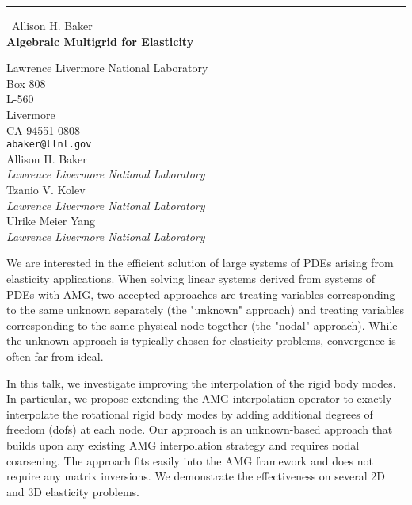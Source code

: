 \documentclass{report}
\begin{document}
\begin{center}
\rule{6in}{1pt} \
{\large Allison H. Baker \\
{\bf Algebraic Multigrid for Elasticity}}

Lawrence Livermore National Laboratory \\ Box 808 \\ L-560 \\ Livermore \\ CA 94551-0808
\\
{\tt abaker@llnl.gov}\\
Allison H. Baker\\
{\em Lawrence Livermore National Laboratory}\\
Tzanio V. Kolev\\
{\em Lawrence Livermore National Laboratory}\\
Ulrike Meier Yang \\
{\em Lawrence Livermore National Laboratory}\end{center}

We are interested in the efficient solution of large systems of PDEs
arising from elasticity applications. When solving linear systems
derived from systems of PDEs with AMG, two accepted approaches are
treating variables corresponding to the same unknown separately (the
"unknown" approach) and treating variables corresponding to the same
physical node together (the "nodal" approach). While the unknown
approach is typically chosen for elasticity problems, convergence is
often far from ideal.

In this talk, we investigate improving the interpolation of the rigid
body modes. In particular, we propose extending the AMG interpolation
operator to exactly interpolate the rotational rigid body modes by
adding additional degrees of freedom (dofs) at each node. Our approach
is an unknown-based approach that builds upon any existing AMG
interpolation strategy and requires nodal coarsening. The approach
fits easily into the AMG framework and does not require any matrix
inversions. We demonstrate the effectiveness on several 2D and 3D
elasticity problems.
\end{document}
